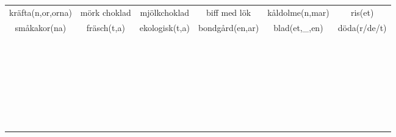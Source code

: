 \begin{center}
\begin{adjustwidth}{-2.5cm}{}
\begin{tabular}{|c c c c c c|}
            kräfta(n,or,orna) & mörk choklad & mjölkchoklad & biff med lök & kåldolme(n,mar) & ris(et) \\
            småkakor(na) & fräsch(t,a) & ekologisk(t,a) & bondgård(en,ar) & blad(et,\_,en) & döda(r/de/t) \\
             &  &  &  &  &  \\
             &  &  &  &  &  \\
             &  &  &  &  &  \\
             &  &  &  &  &  \\
             &  &  &  &  &  \\
             &  &  &  &  &  \\
             &  &  &  &  &  \\
             &  &  &  &  &  \\
             &  &  &  &  &  \\
             &  &  &  &  &  \\
             &  &  &  &  &  \\
             &  &  &  &  &  \\
             &  &  &  &  &  \\
             &  &  &  &  &  \\
             &  &  &  &  &  \\
             &  &  &  &  &  \\
             &  &  &  &  &  \\
             &  &  &  &  &  \\
             &  &  &  &  &  \\
             &  &  &  &  &  \\
             &  &  &  &  &  \\
             &  &  &  &  &  \\
             &  &  &  &  &  \\
             &  &  &  &  &  \\
             &  &  &  &  &  \\
             &  &  &  &  &  \\
             &  &  &  &  &  \\
             &  &  &  &  &  \\
             &  &  &  &  &  \\
             &  &  &  &  &  \\
            \hline
        \end{tabular}
    \end{adjustwidth}
\end{center}

